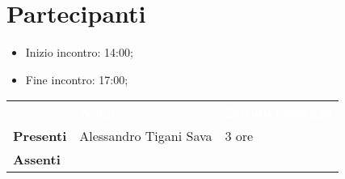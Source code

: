 \section{Partecipanti}

\begin{itemize}
    \item Inizio incontro: 14:00;
    \item Fine incontro: 17:00;
\end{itemize}


\begin{center}
{\renewcommand{\arraystretch}{1.5}
\begin{tabular}{lll}
	\rowcolor[RGB]{33, 73, 50}
	                    & \textcolor{white}{\textbf{Nome}}  & \textcolor{white}{\textbf{Durata presenza}} \\
	\rowcolor[RGB]{216, 235, 171}
	\textbf{Presenti}   & Alessandro Tigani Sava            & 3 ore     \\
	\rowcolor[RGB]{233, 245, 206}
	\textbf{Assenti}	& 	                                &	        \\
\end{tabular}	
}
\end{center}